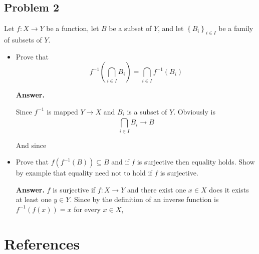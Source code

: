 \documentclass{article}
\theoremstyle{remark}
\begin{document}
\subsection{Problem 2}%
\label{sub:problem_2} 

Let $f:  X \to  Y$ be a function, let $B$ be a subset of $Y$, and let $\left\{ B_{i} \right\}_{i \in  I}$ be a family of subsets of $Y$.

\begin{itemize}
  \item Prove that \[
      f^{-1} \left( \bigcap_{i \in  I}^{} B_{i} \right)  =   \bigcap_{i \in  I}^{}  f^{-1} \left( B_{i} \right)
  \] 
  \begin{tcolorbox}
    \textbf{Answer.} 
    
    Since $f^{-1} $ is mapped $Y \to  X$ and $B_{i}$ is a subset of $Y$. Obviously is \[
      \bigcap_{i \in  I}^{} B_{i} \to  B
    \] 

    And since 
  \end{tcolorbox}
\item Prove that $f\left( f^{-1}\left( B \right) \right) \subseteq  B$ and if $f$ is surjective then equality holds. Show by example that equality need not to hold if $f$ is surjective. 
  \begin{tcolorbox}
    \textbf{Answer.} 
    $f$ is surjective  if $f: X \to  Y$ and there exist one $x \in  X$ does it exists at least one $y \in Y$. Since  by the definition of an inverse function is $f^{-1}  \left( f\left( x \right) \right)= x$ for every $x \in  X$, 
  \end{tcolorbox}
\end{itemize}



\newpage
\section{References}%
\label{sec:references}



\end{document}
